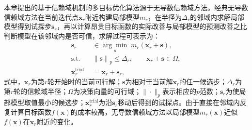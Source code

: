 本章提出的基于信赖域机制的多目标优化算法源于无导数信赖域方法。经典无导数信赖域方法在当前迭代点$\bm{x}_{r}$附近构建局部模型$m_{r}$，在半径为$\Delta_{r}$的邻域内求解局部模型得到试探步$\bm{s}_{r}$，再以计算昂贵目标函数的实际改善与局部模型的预测改善之比判断模型在该邻域内是否可信，求解过程可表示为：
\begin{equation}
\begin{aligned}
\bm{s}_{r}
&\in
\underset{\bm{s}}{\arg\min}\;
m_{r}\left(\bm{x}_{r}+\bm{s}\right),\\
\mathrm{s.t.}\quad
&\left\|\bm{s}\right\|_{p}\leq\Delta_{r},
\qquad
\bm{x}_{r}+\bm{s}\in\Omega,\\
\bm{x}_{r}^{\mathrm{trial}}
&=\bm{x}_{r}+\bm{s}_{r},
\end{aligned}
\label{eq.opt.classicaltr}
\end{equation}
式中，$\bm{x}_{r}$为第$r$轮开始时的当前可行解；$\bm{s}$为相对于当前解$\bm{x}_{r}$的任一候选步；$\Delta_{r}$为第$r$轮的信赖域半径；$\Omega$为决策向量的可行域；$\|\cdot\|_{p}$表示相应的$p$范数；$\bm{s}_{r}$为使局部模型取值最小的候选步；$\bm{x}_{r}^{\mathrm{trial}}$为沿$\bm{s}_r$移动后得到的试探点。由于直接在邻域内反复计算目标函数$f(\bm{x})$的成本较高，无导数信赖域方法以局部模型$m_r(\bm{x})$近似$f(\bm{x})$在$\bm{x}_r$附近的变化。

